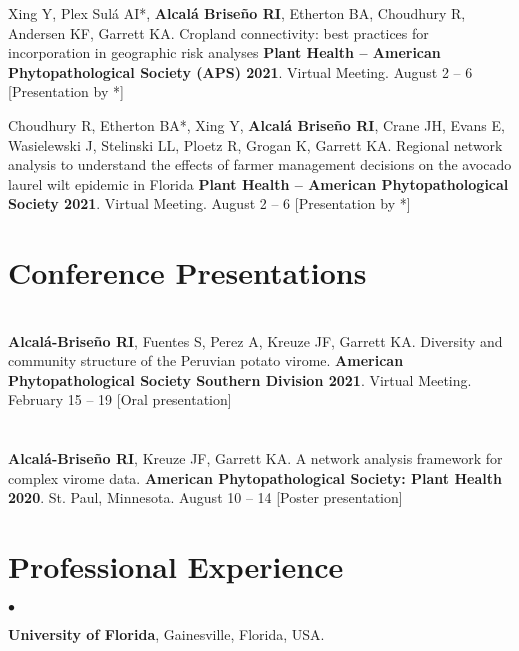 \documentclass[margin,line]{res}
\newenvironment{list2}{
  \begin{list}{$\bullet$}{%
      \setlength{\itemsep}{0in}
      \setlength{\parsep}{0in} \setlength{\parskip}{0in}
      \setlength{\topsep}{0in} \setlength{\partopsep}{0in} 
      \setlength{\leftmargin}{0.2in}}}{\end{list}}
\begin{document}
\begin{resume}
Xing Y,  Plex Sulá AI*,  {\bf Alcal\'a Brise\~no RI},  Etherton BA,  Choudhury R,  Andersen KF, Garrett KA. Cropland connectivity: best practices for incorporation in geographic risk analyses {\bf Plant Health -- American Phytopathological Society  (APS) 2021}. Virtual Meeting. August 2 -- 6 [Presentation by *] \vspace{.05cm}

Choudhury R, Etherton BA*, Xing Y, {\bf Alcal\'a Brise\~no RI}, Crane JH, Evans E,  Wasielewski J,  Stelinski LL, Ploetz R, Grogan K, Garrett KA. Regional network analysis to understand the effects of farmer management decisions on the avocado laurel wilt epidemic in Florida {\bf Plant Health -- American Phytopathological Society  2021}. Virtual Meeting. August 2 -- 6 [Presentation by *] \vspace{.05cm}

\section{\sc  Conference Presentations}
\vspace{1cm}

\section{}

{\bf Alcal\'a-Brise\~no RI}, Fuentes S, Perez A, Kreuze JF, Garrett KA. Diversity and community structure of the Peruvian potato virome. {\bf American Phytopathological Society Southern Division 2021}. Virtual Meeting. February 15 -- 19 [Oral presentation] \vspace{.05cm}

\section{}

{\bf Alcal\'a-Brise\~no RI}, Kreuze JF, Garrett KA. A network analysis framework for complex virome data. {\bf American Phytopathological Society: Plant Health 2020}. St. Paul, Minnesota. August 10 -- 14 [Poster presentation] \vspace{.05cm}


\section{\sc Professional Experience}
\begin{list2}
\item[] {\bf University of Florida}, Gainesville, Florida, USA.
\end{list2}



\end{resume}
\end{document}
